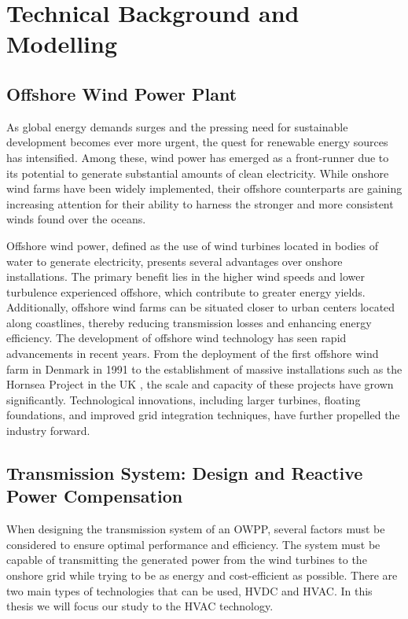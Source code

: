 \documentclass[a4paper,11pt, titlepage, twoside]{article}
\begin{document}
\section{Technical Background and Modelling}\label{Grid}

\subsection{Offshore Wind Power Plant}
As global energy demands surges and the pressing need for sustainable development becomes ever more urgent, 
the quest for renewable energy sources has intensified. Among these, wind power has emerged as a front-runner due to its potential to generate substantial amounts of clean electricity.
While onshore wind farms have been widely implemented, their offshore counterparts are gaining increasing attention for their ability to harness the stronger and more consistent winds found over the oceans.\par

Offshore wind power, defined as the use of wind turbines located in bodies of water to generate electricity, presents several advantages over onshore installations. The primary benefit lies in the higher wind speeds
and lower turbulence experienced offshore, which contribute to greater energy yields. Additionally, offshore wind farms can be situated closer to urban centers located along coastlines, thereby reducing transmission
losses and enhancing energy efficiency. The development of offshore wind technology has seen rapid advancements in recent years. From the deployment of the first offshore wind farm in Denmark in 1991 to the establishment
of massive installations such as the Hornsea Project in the UK \cite{Hornsea}, the scale and capacity of these projects have grown significantly. Technological innovations, including larger turbines, floating foundations, and improved
grid integration techniques, have further propelled the industry forward.

\subsection{Transmission System: Design and Reactive Power Compensation}\label{reactpowpresetation}

When designing the transmission system of an OWPP, several factors must be considered to ensure optimal performance and efficiency. The system must be capable of transmitting the generated power from the wind turbines to the onshore grid
while trying to be as energy and cost-efficient as possible. There are two main types of technologies that can be used, HVDC and HVAC. In this thesis we will focus our study to the HVAC technology.\par
\end{document}

